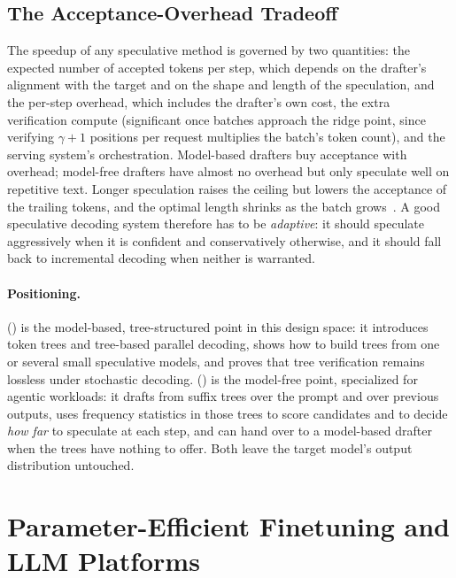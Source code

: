 \subsection{The Acceptance-Overhead Tradeoff}
\label{background:subsec:tradeoff}

The speedup of any speculative method is governed by two quantities: the expected number of accepted tokens per step, which depends on the drafter's alignment with the target and on the shape and length of the speculation, and the per-step overhead, which includes the drafter's own cost, the extra verification compute (significant once batches approach the ridge point, since verifying $\gamma + 1$ positions per request multiplies the batch's token count), and the serving system's orchestration.
Model-based drafters buy acceptance with overhead; model-free drafters have almost no overhead but only speculate well on repetitive text.
Longer speculation raises the ceiling but lowers the acceptance of the trailing tokens, and the optimal length shrinks as the batch grows~\cite{turbospec}.
A good speculative decoding system therefore has to be \emph{adaptive}: it should speculate aggressively when it is confident and conservatively otherwise, and it should fall back to incremental decoding when neither is warranted.

\paragraph{Positioning.}
\SpecInfer () is the model-based, tree-structured point in this design space: it introduces token trees and tree-based parallel decoding, shows how to build trees from one or several small speculative models, and proves that tree verification remains lossless under stochastic decoding.
\SuffixDecoding () is the model-free point, specialized for agentic workloads: it drafts from suffix trees over the prompt and over previous outputs, uses frequency statistics in those trees to score candidates and to decide \emph{how far} to speculate at each step, and can hand over to a model-based drafter when the trees have nothing to offer.
Both leave the target model's output distribution untouched.

\section{Parameter-Efficient Finetuning and LLM Platforms}
\label{background:sec:peft}

